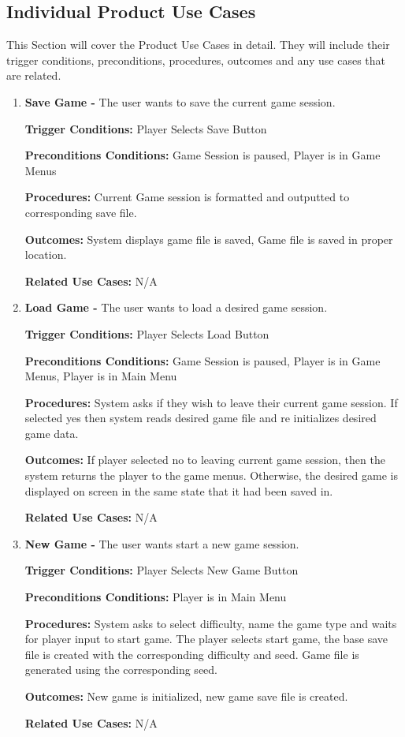 \documentclass{article}
\begin{document}
\subsection{Individual Product Use Cases}
\quad This Section will cover the Product Use Cases in detail. They will include their trigger conditions, preconditions, procedures, outcomes and any use cases that are related.
\begin{enumerate}[{PUC}1. ]

	\item \textbf{Save Game -} The user wants to save the current game session.\par
\textbf{Trigger Conditions: }Player Selects Save Button \par
\textbf{Preconditions Conditions: }Game Session is paused, Player is in Game Menus \par
\textbf{Procedures: }Current Game session is formatted and outputted to corresponding save file. \par
\textbf{Outcomes: }System displays game file is saved, Game file is saved in proper location.  \par
\textbf{Related Use Cases: }N/A \par

	\item \textbf{Load Game -} The user wants to load a desired game session.\par
\textbf{Trigger Conditions: }Player Selects Load Button \par
\textbf{Preconditions Conditions: }Game Session is paused, Player is in Game Menus, Player is in Main Menu \par
\textbf{Procedures: }System asks if they wish to leave their current game session. If selected yes then system reads desired game file and re initializes desired game data.\par
\textbf{Outcomes: }If player selected no to leaving current game session, then the system returns the player to the game menus. Otherwise, the desired game is displayed on screen in the same state that it had been saved in. \par
\textbf{Related Use Cases: }N/A  \par

	\item \textbf{New Game -} The user wants start a new game session.\par
\textbf{Trigger Conditions: }Player Selects New Game Button \par
\textbf{Preconditions Conditions: }Player is in Main Menu \par
\textbf{Procedures: }System asks to select difficulty, name the game type and waits for player input to start game. The player selects start game, the base save file is created with the corresponding difficulty and seed. Game file is generated using the corresponding seed. \par
\textbf{Outcomes: }New game is initialized, new game save file is created. \par
\textbf{Related Use Cases: }N/A \par


\end{enumerate}
\end{document}
